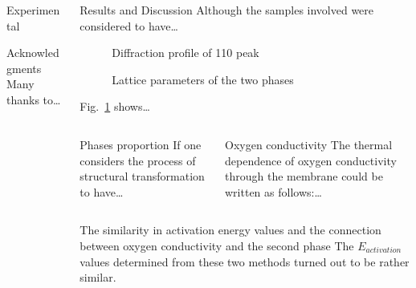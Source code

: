 \documentclass[final]{beamer}
\begin{document}
\begin{frame}{}
\begin{columns}[t]
\begin{column}{.39\linewidth}
\begin{block}{Experimental}
			\end{block}  %
			
			\begin{exampleblock}{Acknowledgments}
				Many thanks to\ldots
			\end{exampleblock}
		\end{column}  %
		
		\begin{column}{.59\linewidth}
			\begin{block}{Results and Discussion}
				Although the samples involved were considered to have\ldots
				
				\begin{figure}[h]
					\centering
					\parbox{0.49\textwidth}{\caption{Diffraction profile of 110 peak}
						\label{fig:diff-profile}}
					\parbox{0.49\textwidth}{\caption{Lattice parameters of the two
							phases}
						\label{fig:lattice-parameters-2phases}}
				\end{figure}
				Fig.~\ref{fig:lattice-parameters-2phases} shows\ldots
				
				\begin{columns}[t]  %
					\begin{exampleblock}{Phases proportion}
						If one considers the process of structural transformation
						to have\ldots
					\end{exampleblock}
					
					\begin{exampleblock}{Oxygen conductivity}
						The thermal dependence of oxygen conductivity through the
						membrane could be written as follows:\ldots
					\end{exampleblock}
				\end{columns}  %
				
				\begin{exampleblock}{The similarity in activation energy values
						and the connection between oxygen conductivity and the
						second phase}
					The $E_{activation}$ values determined from these two methods
					turned out to be rather similar.
				\end{exampleblock}
			\end{block} %
			

\end{column}
\end{columns}
\end{frame}
\end{document}
